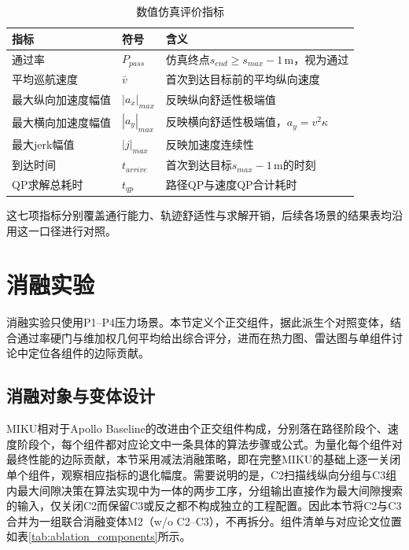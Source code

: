 \begin{table}[htbp]
\centering
\caption{数值仿真评价指标}
\label{tab:metrics}
\small
\begin{tabular}{lll}
\toprule
\textbf{指标} & \textbf{符号} & \textbf{含义} \\
\midrule
通过率 & $P_{pass}$ & 仿真终点$s_{end} \geq s_{max} - 1$\,m，视为通过 \\
平均巡航速度 & $\bar{v}$ & 首次到达目标前的平均纵向速度 \\
最大纵向加速度幅值 & $|a_x|_{max}$ & 反映纵向舒适性极端值 \\
最大横向加速度幅值 & $|a_y|_{max}$ & 反映横向舒适性极端值，$a_y = v^2 \kappa$ \\
最大jerk幅值 & $|j|_{max}$ & 反映加速度连续性 \\
到达时间 & $t_{arrive}$ & 首次到达目标$s_{max}-1$\,m的时刻 \\
QP求解总耗时 & $t_{qp}$ & 路径QP与速度QP合计耗时 \\
\bottomrule
\end{tabular}
\end{table}

这七项指标分别覆盖通行能力、轨迹舒适性与求解开销，后续各场景的结果表均沿用这一口径进行对照。

\section{消融实验}

消融实验只使用P1--P4压力场景。本节定义\AblationComponentTotal{}个正交组件，据此派生\AblationVariantTotal{}个对照变体，结合通过率硬门与\ScoreDimensionCount{}维加权几何平均给出综合评分，进而在热力图、雷达图与单组件讨论中定位各组件的边际贡献。

\subsection{消融对象与变体设计}

MIKU相对于Apollo Baseline的改进由\AblationComponentTotal{}个正交组件构成，分别落在路径阶段\AblationPathComponentTotal{}个、速度阶段\AblationSpeedComponentTotal{}个，每个组件都对应论文中一条具体的算法步骤或公式。为量化每个组件对最终性能的边际贡献，本节采用减法消融策略，即在完整MIKU的基础上逐一关闭单个组件，观察相应指标的退化幅度。需要说明的是，C2扫描线纵向分组与C3组内最大间隙决策在算法实现中为一体的两步工序，分组输出直接作为最大间隙搜索的输入，仅关闭C2而保留C3或反之都不构成独立的工程配置。因此本节将C2与C3合并为一组联合消融变体M2（w/o C2--C3），不再拆分。组件清单与对应论文位置如表\ref{tab:ablation_components}所示。


